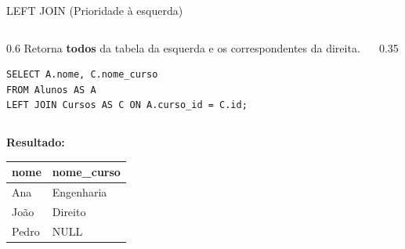 \documentclass[10pt]{beamer}
\begin{document}
\begin{frame}[fragile]{LEFT JOIN (Prioridade à esquerda)}
    \begin{columns}
        \begin{column}{0.6\textwidth}
            Retorna \textbf{todos} da tabela da esquerda e os correspondentes da direita.
            \begin{lstlisting}
SELECT A.nome, C.nome_curso
FROM Alunos AS A
LEFT JOIN Cursos AS C ON A.curso_id = C.id;
            \end{lstlisting}
        \end{column}
        \begin{column}{0.35\textwidth}
            \centering
        \end{column}
    \end{columns}
    \textbf{Resultado:}
    \small
    \begin{table}
        \begin{tabular}{ll}
        \toprule
        \textbf{nome} & \textbf{nome\_curso} \\ \midrule
        Ana & Engenharia \\
        João & Direito \\
        \alert{Pedro} & \alert{NULL} \\ \bottomrule
        \end{tabular}
    \end{table}
\end{frame}
\end{document}
